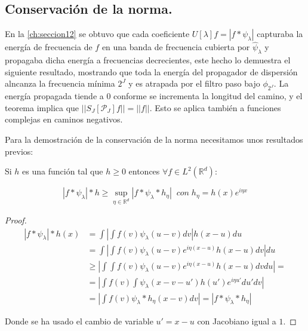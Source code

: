 \subsection{Conservación de la norma.}

En la \autoref{ch:seccion12} se obtuvo que cada coeficiente $U[\lambda]f=|f \ast \psi_\lambda|$ capturaba la energía de frecuencia de $f$ en una banda de frecuencia cubierta por $\widehat{\psi}_\lambda$ y propagaba dicha energía a frecuencias decrecientes, este hecho lo demuestra el siguiente resultado, mostrando que toda la energía del propagador de dispersión alncanza la frecuencia mínima $2^J$ y es atrapada por el filtro paso bajo $\phi_ {2^J}$. La energía propagada tiende a $0$ conforme se incrementa la longitud del camino, y el teorema implica que $||S_J[\mathcal{P}_J]f||=||f||$. Esto se aplica también a funciones complejas en caminos negativos.

\medskip

\noindent Para la demostración de la conservación de la norma necesitamos unos resultados previos: 

\begin{lema} \label{lema::Cota_inferior}
  Si $h$ es una función tal que $h\geq 0$ entonces $\forall f \in L^2(\mathbb{R}^d)$: 
  
  \begin{equation}
    |f \ast \psi_\lambda | \ast h \geq \sup_{\eta \in \mathbb{R}^d} |f\ast \psi_\lambda \ast h_\eta | \; \; con \; h_\eta=h(x)e^{i\eta x}
  \end{equation}
\end{lema}
  
\begin{proof}
  
  \begin{align*}
      |f \ast \psi_\lambda | \ast h (x) &= \int \left| \int f(v)\psi_\lambda(u-v)dv \right| h(x-u)du \\
      &=\int \left | \int f(v) \psi_\lambda(u-v) e^{i\eta(x-u)} h(x-u) dv \right| du \\
      &\geq \left | \int \int f(v) \psi_\lambda(u-v) e^{i\eta(x-u)} h(x-u) dv du \right| = \\
      &= \left | \int f(v) \int  \psi_\lambda(x-v-u')h(u') e^{i\eta u'}  du' dv \right| \\
      &= \left | \int f(v) \psi_\lambda \ast h_\eta(x-v) dv \right| = |f\ast \psi_\lambda \ast h_\eta|
  \end{align*}

  \noindent Donde se ha usado el cambio de variable $u'=x-u$ con Jacobiano igual a $1$.
\end{proof}

